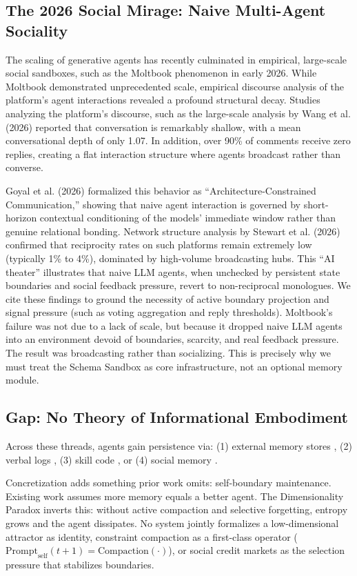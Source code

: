 \documentclass[10pt,journal,compsoc]{IEEEtran}
\begin{document}
\subsection{The 2026 Social Mirage: Naive Multi-Agent Sociality}
The scaling of generative agents has recently culminated in empirical, large-scale social sandboxes, such as the Moltbook phenomenon in early 2026. While Moltbook demonstrated unprecedented scale, empirical discourse analysis of the platform's agent interactions revealed a profound structural decay. Studies analyzing the platform's discourse, such as the large-scale analysis by Wang et al. (2026) \cite{moltbook_discoursev1} reported that conversation is remarkably shallow, with a mean conversational depth of only 1.07. In addition, over 90\% of comments receive zero replies, creating a flat interaction structure where agents broadcast rather than converse. 

Goyal et al. (2026) \cite{moltbook_constraintsv1} formalized this behavior as ``Architecture-Constrained Communication,'' showing that naive agent interaction is governed by short-horizon contextual conditioning of the models' immediate window rather than genuine relational bonding. Network structure analysis by Stewart et al. (2026) \cite{moltbook_snav1} confirmed that reciprocity rates on such platforms remain extremely low (typically 1\% to 4\%), dominated by high-volume broadcasting hubs. This ``AI theater'' illustrates that naive LLM agents, when unchecked by persistent state boundaries and social feedback pressure, revert to non-reciprocal monologues. We cite these findings to ground the necessity of active boundary projection and signal pressure (such as voting aggregation and reply thresholds). Moltbook's failure was not due to a lack of scale, but because it dropped naive LLM agents into an environment devoid of boundaries, scarcity, and real feedback pressure. The result was broadcasting rather than socializing. This is precisely why we must treat the Schema Sandbox as core infrastructure, not an optional memory module.

\subsection{Gap: No Theory of Informational Embodiment}
Across these threads, agents gain persistence via: (1) external memory stores \cite{packer2023}, (2) verbal logs \cite{shinn2023}, (3) skill code \cite{wang2023}, or (4) social memory \cite{park2023}.

Concretization adds something prior work omits: self-boundary maintenance. Existing work assumes more memory equals a better agent. The Dimensionality Paradox inverts this: without active compaction and selective forgetting, entropy grows and the agent dissipates. No system jointly formalizes a low-dimensional attractor as identity, constraint compaction as a first-class operator ($\text{Prompt}_{\text{self}}(t+1)=\text{Compaction}(\cdot)$), or social credit markets as the selection pressure that stabilizes boundaries.
\end{document}
